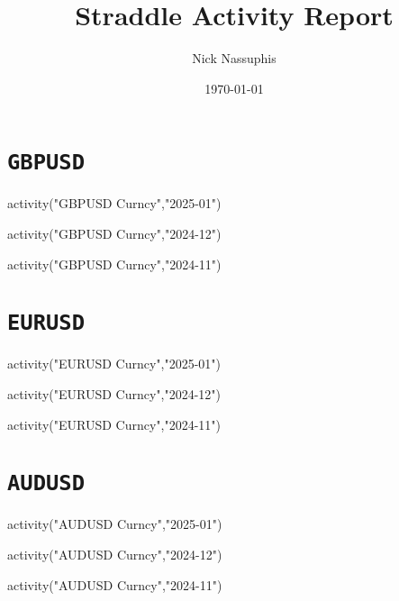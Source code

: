 \documentclass{article}
\title{Straddle Activity Report}
\author{Nick Nassuphis}
\date{\today}
\begin{document}
\maketitle  %
\newpage
\tableofcontents  %
\newpage

\section{\texttt{GBPUSD}}

\begin{pycode}
activity("GBPUSD Curncy","2025-01")
\end{pycode}

\begin{pycode}
activity("GBPUSD Curncy","2024-12")
\end{pycode}

\begin{pycode}
activity("GBPUSD Curncy","2024-11")
\end{pycode}

\newpage
\section{\texttt{EURUSD}}

\begin{pycode}
activity("EURUSD Curncy","2025-01")
\end{pycode}

\begin{pycode}
activity("EURUSD Curncy","2024-12")
\end{pycode}

\begin{pycode}
activity("EURUSD Curncy","2024-11")
\end{pycode}

\newpage
\section{\texttt{AUDUSD}}

\begin{pycode}
activity("AUDUSD Curncy","2025-01")
\end{pycode}

\begin{pycode}
activity("AUDUSD Curncy","2024-12")
\end{pycode}

\begin{pycode}
activity("AUDUSD Curncy","2024-11")
\end{pycode}
\end{document}
